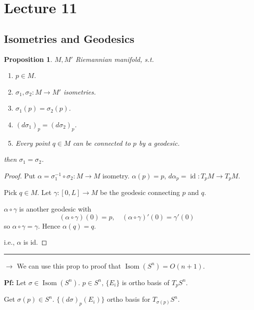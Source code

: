 \documentclass[11pt, a4paper]{article}
\theoremstyle{plain}
\newtheorem{proposition}[theorem]{Proposition}
\theoremstyle{definition}
\theoremstyle{remark}
\begin{document}
{
\section{Lecture 11}

\subsection{Isometries and Geodesics}

\begin{proposition}
$M, M'$ Riemannian manifold, s.t.
\begin{enumerate}
    \item $p \in M$.
    \item $\sigma_1, \sigma_2 : M \to M'$ isometries.
    \item $\sigma_1(p) = \sigma_2(p)$.
    \item $(d\sigma_1)_p = (d\sigma_2)_p$.
    \item Every point $q \in M$ can be connected to $p$ by a geodesic.
\end{enumerate}
then $\sigma_1 = \sigma_2$.
\end{proposition}

\vspace{1em}
\begin{proof}
    

Put $\alpha = \sigma_1^{-1} \circ \sigma_2 : M \to M$ isometry. $\alpha(p) = p$, $d\alpha_p = \operatorname{id} : T_pM \to T_pM$. 

\noindent
Pick $q \in M$. Let $\gamma : [0, L] \to M$ be the geodesic connecting $p$ and $q$. 

\noindent
$\alpha \circ \gamma$ is another geodesic with 
\[ (\alpha \circ \gamma)(0) = p, \quad (\alpha \circ \gamma)'(0) = \gamma'(0) \]
so $\alpha \circ \gamma = \gamma$. Hence $\alpha(q) = q$. 

\noindent
i.e., $\alpha$ is id.
\end{proof} 
\vspace{2em}
\hrule
\vspace{2em}

\noindent
$\rightarrow$ We can use this prop to proof that $\operatorname{Isom}(S^n) = O(n+1)$.

\vspace{1em}
\noindent
\textbf{Pf:} Let $\sigma \in \operatorname{Isom}(S^n)$. $p \in S^n$, $\{E_i\}$ is ortho basis of $T_p S^n$. 

\noindent
Get $\sigma(p) \in S^n$. $\{(d\sigma)_p(E_i)\}$ ortho basis for $T_{\sigma(p)} S^n$. 

}
\end{document}
